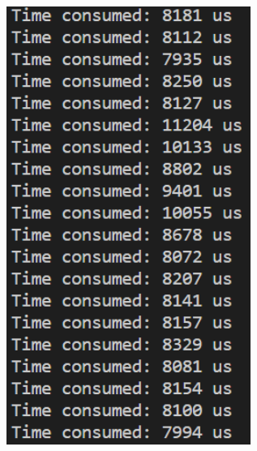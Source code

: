 \documentclass[a4paper,12pt]{article}
\begin{document}
\begin{figure}[H]
{\begin{minipage}[t]{0.4\textwidth}
        \includegraphics[width = 0.71\textwidth]{N = 16000000, Asm optimization.png}
    \end{minipage}}
\end{figure}
\end{document}
